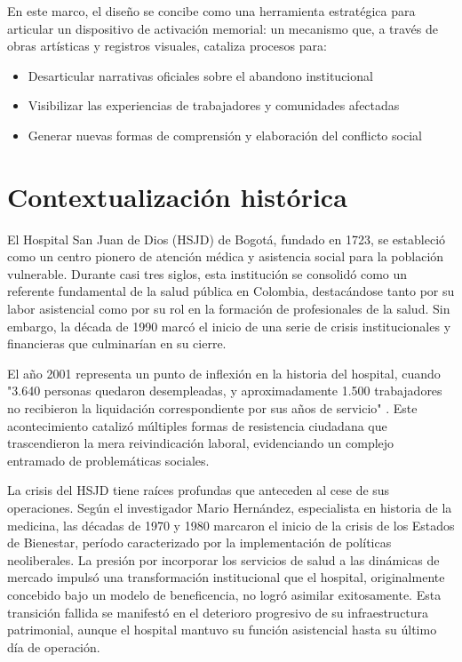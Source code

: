 \textcolor{edit30sept}{En este marco, el diseño se concibe como una herramienta estratégica para articular un dispositivo de activación memorial: un mecanismo que, a través de obras artísticas y registros visuales, cataliza procesos para:}

\begin{itemize}
    \item Desarticular narrativas oficiales sobre el abandono institucional
    \item Visibilizar las experiencias de trabajadores y comunidades afectadas
    \item Generar nuevas formas de comprensión y elaboración del conflicto social
\end{itemize}

\section*{Contextualización histórica}

El Hospital San Juan de Dios (HSJD) de Bogotá, fundado en 1723, se estableció como un centro pionero de atención médica y asistencia social para la población vulnerable. Durante casi tres siglos, esta institución se consolidó como un referente fundamental de la salud pública en Colombia, destacándose tanto por su labor asistencial como por su rol en la formación de profesionales de la salud. Sin embargo, la década de 1990 marcó el inicio de una serie de crisis institucionales y financieras que culminarían en su cierre.

El año 2001 representa un punto de inflexión en la historia del hospital, cuando "3.640 personas quedaron desempleadas, y aproximadamente 1.500 trabajadores no recibieron la liquidación correspondiente por sus años de servicio" \parencite{Castiblanco2017}. Este acontecimiento catalizó múltiples formas de resistencia ciudadana que trascendieron la mera reivindicación laboral, evidenciando un complejo entramado de problemáticas sociales.

La crisis del HSJD tiene raíces profundas que anteceden al cese de sus operaciones. Según el investigador Mario Hernández, especialista en historia de la medicina, las décadas de 1970 y 1980 marcaron el inicio de la crisis de los Estados de Bienestar, período caracterizado por la implementación de políticas neoliberales. La presión por incorporar los servicios de salud a las dinámicas de mercado impulsó una transformación institucional que el hospital, originalmente concebido bajo un modelo de beneficencia, no logró asimilar exitosamente. Esta transición fallida se manifestó en el deterioro progresivo de su infraestructura patrimonial, aunque el hospital mantuvo su función asistencial hasta su último día de operación.

